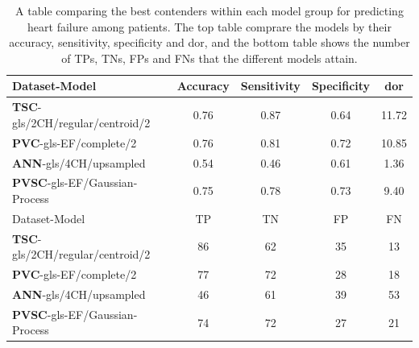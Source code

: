 \begin{table}
    \centering
    \begin{tabular}{lcccc}
        \toprule
        Dataset-Model                           &  Accuracy &  Sensitivity &  Specificity &  \acrshort{dor} \\
        \midrule
        \textbf{TSC}-gls/2CH/regular/centroid/2 &      0.76 &         0.87 &         0.64 & 11.72 \\
        \textbf{PVC}-gls-EF/complete/2          &      0.76 &         0.81 &         0.72 & 10.85 \\
        \textbf{ANN}-gls/4CH/upsampled           &      0.54 &         0.46 &         0.61 & 1.36 \\
        \textbf{PVSC}-gls-EF/Gaussian-Process   &      0.75 &         0.78 &         0.73 & 9.40 \\
        \midrule
        Dataset-Model                           &  TP &  TN &  FP &  FN \\
        \midrule
        \textbf{TSC}-gls/2CH/regular/centroid/2 &  86 &  62 &  35 &  13 \\
        \textbf{PVC}-gls-EF/complete/2          &  77 &  72 &  28 &  18 \\
        \textbf{ANN}-gls/4CH/upsampled           &  46 &  61 &  39 &  53 \\
        \textbf{PVSC}-gls-EF/Gaussian-Process   &  74 &  72 &  27 &  21 \\
        \bottomrule
    \end{tabular}
    \caption{A table comparing the best contenders within each model group for predicting heart failure among patients. 
             The top table comprare the models by their accuracy, sensitivity, specificity and \acrshort{dor}, 
             and the bottom table shows the number of TPs, TNs, FPs and FNs that the different models attain.}
    \label{tab:hf_compare}
\end{table}

